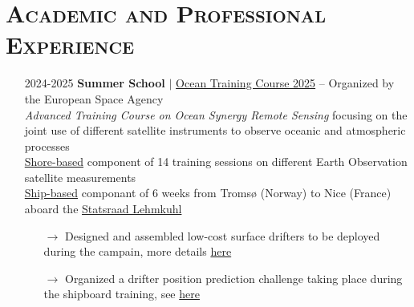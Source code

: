 \documentclass{article}
\begin{document}
\section*{\textsc{Academic and Professional Experience}}
\begin{itemize}
<<<<<<< HEAD
    \item[] 2024-2025 \tabto{2cm} \textbf{Summer School} $\vert$ \href{https://oceantrainingcourse2025.esa.int/}{Ocean Training Course 2025} – Organized by the European Space Agency \\[.1 cm]
    \tabto{2cm} \textit{Advanced Training Course on Ocean Synergy Remote Sensing} focusing on the joint use of different satellite \tabto{2cm} instruments to observe oceanic and atmospheric processes \\[.1 cm]
    \tabto{2cm} \underline{Shore-based} component of 14 training sessions on different Earth Observation satellite measurements \\[.1 cm]
    \tabto{2cm} \underline{Ship-based} componant of 6 weeks from Tromsø (Norway) to Nice (France) aboard the \href{https://lehmkuhl.no/en/}{Statsraad Lehmkuhl}
    \vspace{-.4 cm}
    \begin{itemize}[left=2cm]
        \item[$\rightarrow$] Designed and assembled low-cost surface drifters to be deployed during the campain, more details \href{https://github.com/vadmbertr/otc25-cannelloni}{here}
        \item[$\rightarrow$] Organized a drifter position prediction challenge taking place during the shipboard training, see \href{https://vadmbertr.github.io/otc25-virtual-drift/}{here}
    \end{itemize}


\end{itemize}
\end{document}
